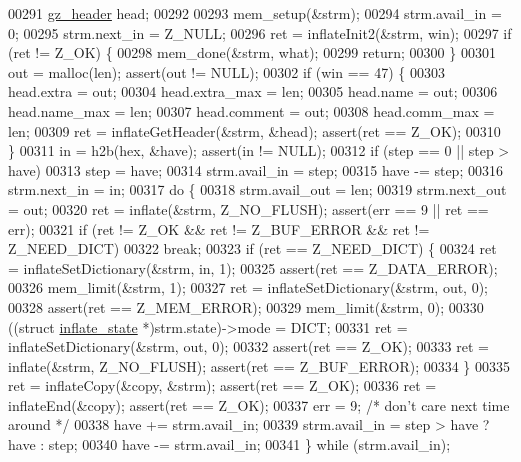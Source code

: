 \begin{DoxyCode}
{{{{{00291     \hyperlink{structgz__header__s}{gz\_header} head;
00292 
00293     mem\_setup(&strm);
00294     strm.avail\_in = 0;
00295     strm.next\_in = Z\_NULL;
00296     ret = inflateInit2(&strm, win);
00297     \textcolor{keywordflow}{if} (ret != Z\_OK) \{
00298         mem\_done(&strm, what);
00299         \textcolor{keywordflow}{return};
00300     \}
00301     out = malloc(len);                          assert(out != NULL);
00302     \textcolor{keywordflow}{if} (win == 47) \{
00303         head.extra = out;
00304         head.extra\_max = len;
00305         head.name = out;
00306         head.name\_max = len;
00307         head.comment = out;
00308         head.comm\_max = len;
00309         ret = inflateGetHeader(&strm, &head);   assert(ret == Z\_OK);
00310     \}
00311     in = h2b(hex, &have);                       assert(in != NULL);
00312     \textcolor{keywordflow}{if} (step == 0 || step > have)
00313         step = have;
00314     strm.avail\_in = step;
00315     have -= step;
00316     strm.next\_in = in;
00317     \textcolor{keywordflow}{do} \{
00318         strm.avail\_out = len;
00319         strm.next\_out = out;
00320         ret = inflate(&strm, Z\_NO\_FLUSH);       assert(err == 9 || ret == err);
00321         \textcolor{keywordflow}{if} (ret != Z\_OK && ret != Z\_BUF\_ERROR && ret != Z\_NEED\_DICT)
00322             \textcolor{keywordflow}{break};
00323         \textcolor{keywordflow}{if} (ret == Z\_NEED\_DICT) \{
00324             ret = inflateSetDictionary(&strm, in, 1);
00325                                                 assert(ret == Z\_DATA\_ERROR);
00326             mem\_limit(&strm, 1);
00327             ret = inflateSetDictionary(&strm, out, 0);
00328                                                 assert(ret == Z\_MEM\_ERROR);
00329             mem\_limit(&strm, 0);
00330             ((\textcolor{keyword}{struct }\hyperlink{structinflate__state}{inflate\_state} *)strm.state)->mode = DICT;
00331             ret = inflateSetDictionary(&strm, out, 0);
00332                                                 assert(ret == Z\_OK);
00333             ret = inflate(&strm, Z\_NO\_FLUSH);   assert(ret == Z\_BUF\_ERROR);
00334         \}
00335         ret = inflateCopy(&copy, &strm);        assert(ret == Z\_OK);
00336         ret = inflateEnd(&copy);                assert(ret == Z\_OK);
00337         err = 9;                        \textcolor{comment}{/* don't care next time around */}
00338         have += strm.avail\_in;
00339         strm.avail\_in = step > have ? have : step;
00340         have -= strm.avail\_in;
00341     \} \textcolor{keywordflow}{while} (strm.avail\_in);
}}}}}
\end{DoxyCode}
